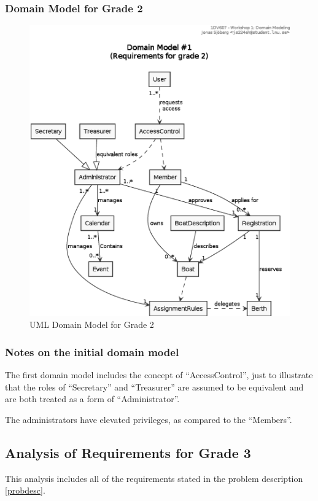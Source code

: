 \subsubsection{Domain Model for Grade 2}
\begin{figure}[htbp]
  \centering
  \includegraphics[width=\linewidth]{uml/domain-model_1.eps}
  \caption{UML Domain Model for Grade 2}
  \label{fig:uml-domain1}
\end{figure}

\subsubsection{Notes on the initial domain model}
The first domain model includes the concept of ``AccessControl'', just to
illustrate that the roles of ``Secretary'' and ``Treasurer'' are assumed to be
equivalent and are both treated as a form of ``Administrator''.

The administrators have elevated privileges, as compared to the ``Members''.



\subsection{Analysis of Requirements for Grade 3}
This analysis includes all of the requirements stated in the problem
description \ref{probdesc}.

